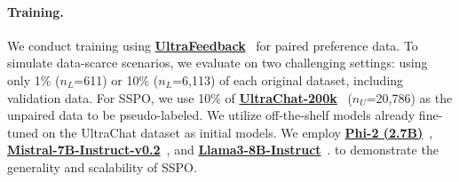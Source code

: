\documentclass{article} %
\begin{document}
\paragraph{Training.} We conduct training using \href{https://huggingface.co/datasets/HuggingFaceH4/ultrafeedback_binarized}{\textbf{UltraFeedback}}~\citep{cui2024ultrafeedbackboostinglanguagemodels} for paired preference data. To simulate data-scarce scenarios, we evaluate on two challenging settings: using only 1\% ($n_L$=611) or 10\% ($n_L$=6,113) of each original dataset, including validation data. For SSPO, we use 10\% of \href{https://huggingface.co/datasets/HuggingFaceH4/ultrachat_200k}{\textbf{UltraChat-200k}}~\citep{ding2023enhancingchatlanguagemodels} ($n_U$=20,786) as the unpaired data to be pseudo-labeled.
We utilize off-the-shelf models already fine-tuned on the UltraChat dataset as initial models. We employ \href{https://huggingface.co/lole25/phi-2-sft-ultrachat-full}{\textbf{Phi-2 (2.7B)}}~\citep{javaheripi2023phi}, \href{https://huggingface.co/mistralai/Mistral-7B-Instruct-v0.2}{\textbf{Mistral-7B-Instruct-v0.2}}~\citep{jiang2023mistral7b}, and \href{https://huggingface.co/meta-llama/Meta-Llama-3-8B-Instruct}{\textbf{Llama3-8B-Instruct}}~\citep{dubey2024llama}. to demonstrate the generality and scalability of SSPO.
\end{document}
